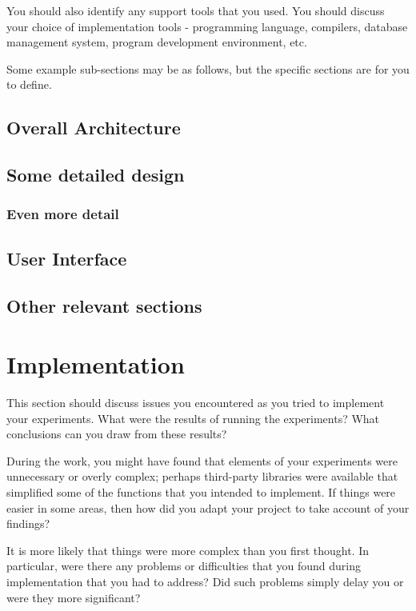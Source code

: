 You should also identify any support tools that you used. You should discuss your choice of implementation tools - programming language, compilers, database management system, program development environment, etc.

Some example sub-sections may be as follows, but the specific sections are for you to define. 

\subsection{Overall Architecture}

\subsection{Some detailed design}

\subsubsection{Even more detail}

\subsection{User Interface}

\subsection{Other relevant sections}

\section{Implementation}

This section should discuss issues you encountered as you tried to implement your experiments. What were the results of running the experiments? What conclusions can you draw from these results? 

During the work, you might have found that elements of your experiments were unnecessary or overly complex; perhaps third-party libraries were available that simplified some of the functions that you intended to implement. If things were easier in some areas, then how did you adapt your project to take account of your findings?

It is more likely that things were more complex than you first thought. In particular, were there any problems or difficulties that you found during implementation that you had to address? Did such problems simply delay you or were they more significant? 

